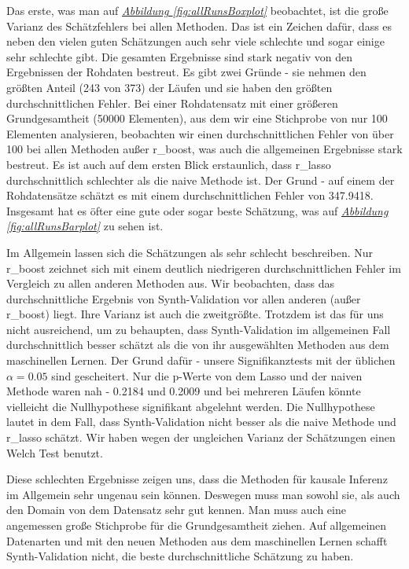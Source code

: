 \documentclass[12pt,a4paper,twoside]{scrartcl}
\numberwithin{equation}{section}
\newcommand{\reffig}[1]{\emph{\hyperref[#1]{Abbildung \ref*{#1}}}}
\begin{document}
\noindent
Das erste, was man auf \reffig{fig:allRunsBoxplot} beobachtet, ist die große Varianz des Schätzfehlers bei allen Methoden. Das ist ein Zeichen dafür, dass es neben den vielen guten Schätzungen auch sehr viele schlechte und sogar einige sehr schlechte gibt. Die gesamten Ergebnisse sind stark negativ von den Ergebnissen der Rohdaten bestreut. Es gibt zwei Gründe - sie nehmen den größten Anteil (243 von 373) der Läufen und sie haben den größten durchschnittlichen Fehler. Bei einer Rohdatensatz mit einer größeren Grundgesamtheit (50000 Elementen), aus dem wir eine Stichprobe von nur 100 Elementen analysieren, beobachten wir einen durchschnittlichen Fehler von über 100 bei allen Methoden außer r\_boost, was auch die allgemeinen Ergebnisse stark bestreut. Es ist auch auf dem ersten Blick erstaunlich, dass r\_lasso durchschnittlich schlechter als die naive Methode ist. Der Grund - auf einem der Rohdatensätze schätzt es mit einem durchschnittlichen Fehler von 347.9418. Insgesamt hat es öfter eine gute oder sogar beste Schätzung, was auf \reffig{fig:allRunsBarplot} zu sehen ist.\par 

\noindent
Im Allgemein lassen sich die Schätzungen als sehr schlecht beschreiben. Nur r\_boost zeichnet sich mit einem deutlich niedrigeren durchschnittlichen Fehler im Vergleich zu allen anderen Methoden aus. Wir beobachten, dass das durchschnittliche Ergebnis von Synth-Validation vor allen anderen (außer r\_boost) liegt. Ihre Varianz ist auch die zweitgrößte. Trotzdem ist das für uns nicht ausreichend, um zu behaupten, dass Synth-Validation im allgemeinen Fall durchschnittlich besser schätzt als die von ihr ausgewählten Methoden aus dem maschinellen Lernen. Der Grund dafür - unsere Signifikanztests mit der üblichen $\alpha = 0.05$ sind gescheitert. Nur die p-Werte von dem Lasso und der naiven Methode waren nah -  0.2184 und 0.2009 und bei mehreren Läufen könnte vielleicht die Nullhypothese signifikant abgelehnt werden. Die Nullhypothese lautet in dem Fall, dass Synth-Validation nicht besser als die naive Methode und r\_lasso schätzt. Wir haben wegen der ungleichen Varianz der Schätzungen einen Welch Test benutzt.\par 

\noindent
Diese schlechten Ergebnisse zeigen uns, dass die Methoden für kausale Inferenz im Allgemein sehr ungenau sein können. Deswegen muss man sowohl sie, als auch den Domain von dem Datensatz sehr gut kennen. Man muss auch eine angemessen große Stichprobe für die Grundgesamtheit ziehen. Auf allgemeinen Datenarten und mit den neuen Methoden aus dem maschinellen Lernen schafft Synth-Validation nicht, die beste durchschnittliche Schätzung zu haben.\par 
\end{document}
